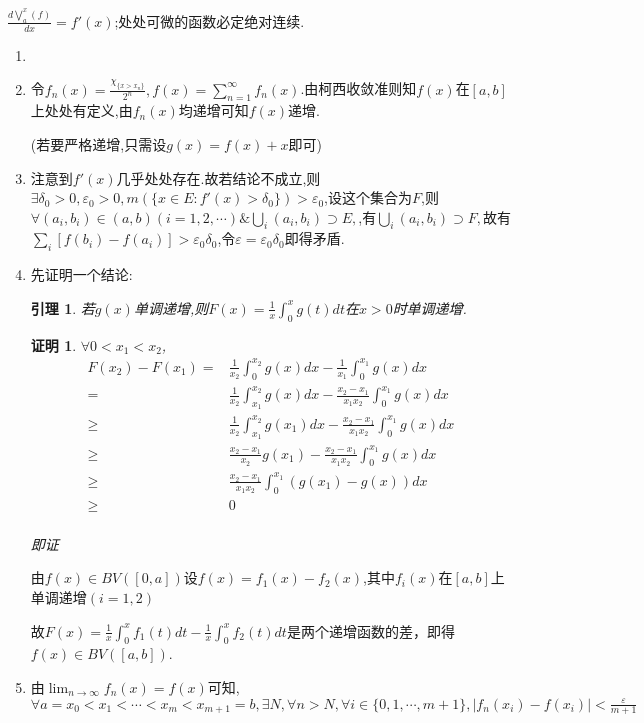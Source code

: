 \documentclass[UTF8, a4paper, 12pt, oneside, onecolumn]{article}
\numberwithin{equation}{section}
\numberwithin{figure}{section}
\numberwithin{table}{section}
\theoremstyle{nonumberplain}	%
\newtheorem{Proof}{\hspace*{4.5ex}证明}
\theoremstyle{plain}	%
\theoremstyle{plain}	%
\newtheorem{Lemma}{\hspace*{4.5ex}引理}
\theoremstyle{plain}	%
\theoremstyle{plain}	%
\theoremstyle{nonumberplain}
\begin{document}
$\frac{d\bigvee_a^x(f)}{dx}=f'(x)$;处处可微的函数必定绝对连续.
\begin{enumerate}
	\item
	\item 令$\displaystyle f_n(x)=\frac{\chi_{\{x>x_n\} } }{2^n},f(x)=\sum_{n=1}^{\infty} f_n(x)$.由柯西收敛准则知$f(x)$在$[a,b]$上处处有定义,由$f_n(x)$均递增可知$f(x)$递增.
	
	(若要严格递增,只需设$g(x)=f(x)+x$即可)
	\item 注意到$f'(x)$几乎处处存在.故若结论不成立,则$\exists \delta_0>0,\varepsilon_0>0,m(\{x\in E:f'(x)>\delta_0\})>\varepsilon_0$,设这个集合为$F$,则$\displaystyle\forall (a_i,b_i)\in (a,b)(i=1,2,\cdots)\&\bigcup_{i}(a_i,b_i)\supset E,$,有$\displaystyle\bigcup_{i}(a_i,b_i)\supset F,$故有$\displaystyle\sum_{i}[f(b_i)-f(a_i)]>\varepsilon_0\delta_0$,令$\varepsilon=\varepsilon_0\delta_0$即得矛盾.
	\item 先证明一个结论:
	\begin{Lemma}
		若$g(x)$单调递增,则$\displaystyle F(x)=\frac{1}{x}\int_{0}^{x}g(t)dt$在$x>0$时单调递增.
	\end{Lemma}
	\begin{Proof}
		$\forall 0<x_1<x_2$,
		\begin{align*}
				F(x_2)-F(x_1)=&\frac{1}{x_2}\int_{0}^{x_2}g(x)dx-\frac{1}{x_1}\int_{0}^{x_1}g(x)dx\\
				=&\frac{1}{x_2}\int_{x_1}^{x_2}g(x)dx-\frac{x_2-x_1}{x_1x_2}\int_{0}^{x_1}g(x)dx\\
				\geqslant&\frac{1}{x_2}\int_{x_1}^{x_2}g(x_1)dx-\frac{x_2-x_1}{x_1x_2}\int_{0}^{x_1}g(x)dx\\
				\geqslant&\frac{x_2-x_1}{x_2}g(x_1)-\frac{x_2-x_1}{x_1x_2}\int_{0}^{x_1}g(x)dx\\
				\geqslant&\frac{x_2-x_1}{x_1x_2}\int_{0}^{x_1}( g(x_1)-g(x) )dx\\
				\geqslant&0\\
		\end{align*}
		
		即证
	\end{Proof}
	
	由$f(x)\in BV([0,a])$设$f(x)=f_1(x)-f_2(x)$,其中$f_i(x)$在$[a,b]$上单调递增$(i=1,2)$
	
	故$\displaystyle F(x)=\frac{1}{x}\int_{0}^{x}f_1(t)dt-\frac{1}{x}\int_{0}^{x}f_2(t)dt$是两个递增函数的差，即得$f(x)\in BV([a,b])$.
	\item 由$\displaystyle \lim_{n\rightarrow \infty}f_n(x)=f(x)$可知,$\displaystyle\forall a=x_0<x_1<\cdots<x_m<x_{m+1}=b,\exists N,\forall n>N,\forall i\in\{0,1,\cdots,m+1\},|f_n(x_i)-f(x_i)|<\frac{\varepsilon}{m+1}$
	

\end{enumerate}
\end{document}
